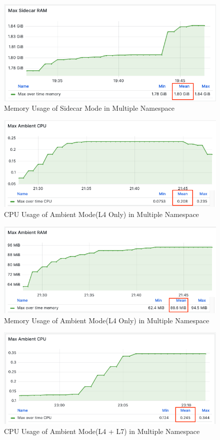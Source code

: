 \begin{figure}[H]
  \centering
  \includegraphics[width=0.8\linewidth]{resources/multi-ns-sidecar-mem.png}
  \caption{Memory Usage of Sidecar Mode in Multiple Namespace}
\end{figure}

\begin{figure}[H]
  \centering
  \includegraphics[width=0.8\linewidth]{resources/ambient-multi-ns-l4-cpu.png}
  \caption{CPU Usage of Ambient Mode(L4 Only) in Multiple Namespace}
\end{figure}

\begin{figure}[H]
  \centering
  \includegraphics[width=0.85\linewidth]{resources/ambient-multi-ns-l4-mem.png}
  \caption{Memory Usage of Ambient Mode(L4 Only) in Multiple Namespace}
\end{figure}

\begin{figure}[H]
  \centering
  \includegraphics[width=0.85\linewidth]{resources/ambient-multi-ns-l4-l7-cpu.png}
  \caption{CPU Usage of Ambient Mode(L4 + L7) in Multiple Namespace}
\end{figure}

